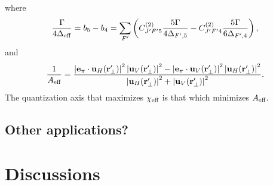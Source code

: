 \documentclass[preprint,aps,pra,onecolumn]{revtex4-1} %
\begin{document}
where
\begin{equation} 
\frac{\Gamma}{4\Delta_{\text{eff}}} = b_5 - b_4 = \sum_{F'}  \left( C^{(2)}_{J'F'5}\frac{5\Gamma}{4\Delta_{F',5}} -  C^{(2)}_{J'F'4}\frac{5\Gamma}{6 \Delta_{F',4} } \right),
\end{equation}
and
\begin{equation}
\frac{1}{A_{\text{eff}}} = \frac{\left|\mathbf{e}_\pi \cdot \mathbf{u}_H(\mathbf{r}'_\perp)\right|^2 \left|\mathbf{u}_V(\mathbf{r}'_\perp)\right|^2 - 
\left|\mathbf{e}_\pi \cdot \mathbf{u}_V(\mathbf{r}'_\perp)\right|^2 \left|\mathbf{u}_H(\mathbf{r}'_\perp)\right|^2}
{ \left|\mathbf{u}_H(\mathbf{r}'_\perp)\right|^2 +\left|\mathbf{u}_V(\mathbf{r}'_\perp)\right|^2 }.
\end{equation}
The quantization axis that maximizes $\chi_{\text{eff}}$ is that which minimizes $A_{\text{eff}}$.




\subsection{Other applications?} 


\section{Discussions}




%
%


%	
%	
\end{document}
